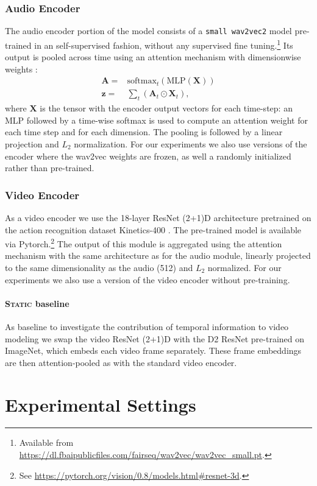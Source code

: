 \subsubsection{Audio Encoder}
The audio encoder portion of the model consists of a {\tt small
  wav2vec2} model \citep{wav2vec2} pre-trained in an self-supervised
fashion, without any supervised fine tuning.\footnote{Available from
  \url{https://dl.fbaipublicfiles.com/fairseq/wav2vec/wav2vec_small.pt}.}
Its output is pooled across time using an attention mechanism with
dimensionwise weights \citep{Merkx2019}:
\begin{equation}
  \begin{aligned}
    \mathbf{A} = & \mathrm{softmax}_t\left(\mathrm{MLP}(\mathbf{X})\right)\\
    \mathbf{z} = & \sum_t \left( \mathbf{A}_{t} \odot \mathbf{X}_{t} \right),
  \end{aligned}
  \label{eq:att-pool}
\end{equation}
where $\mathbf{X}$ is the tensor with the encoder output vectors for
each time-step: an MLP followed by a time-wise
softmax is used to compute an attention weight for each time step and for each
dimension.
The pooling is followed by a linear projection and $L_2$
normalization. For our experiments we also use versions of the encoder
where the wav2vec weights are frozen, as well a randomly initialized
rather than pre-trained.



\subsubsection{Video Encoder}
As a video encoder we use the 18-layer ResNet (2+1)D architecture
\citep{tran2018closer} pretrained on the action recognition dataset
Kinetics-400 \citep{DBLP:journals/corr/KayCSZHVVGBNSZ17}. The
pre-trained model is available via Pytorch.\footnote{See
  \url{https://pytorch.org/vision/0.8/models.html\#resnet-3d}.}  The
output of this module is aggregated using the attention mechanism with
the same architecture as for the audio module, linearly projected to
the same dimensionality as the audio (512) and $L_2$ normalized.
For our experiments we also use a version of the video encoder
without pre-training.

\paragraph{\textsc{Static} baseline}
As baseline to investigate the contribution of temporal information to
video modeling we swap the video ResNet (2+1)D with the D2 ResNet
pre-trained on ImageNet, which embeds each video frame
separately. These frame embeddings are then attention-pooled as with
the standard video encoder. 


\section{Experimental Settings}
